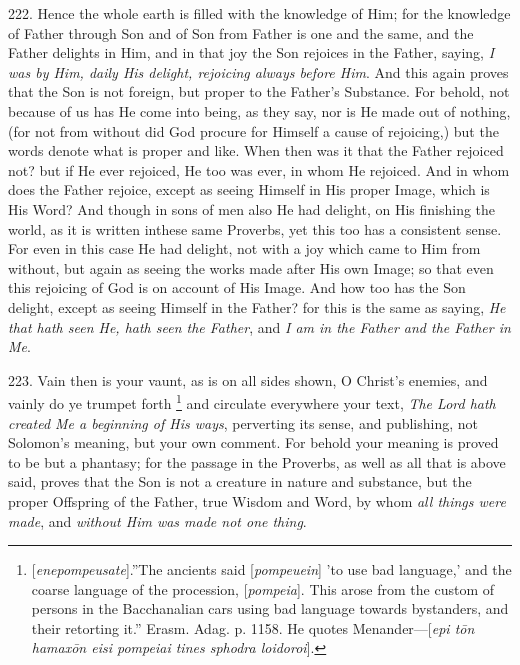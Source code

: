222. Hence the whole earth is
filled with the knowledge of Him; for the knowledge of Father through
Son and of Son from Father is one and the same, and the Father
delights in Him, and in that joy the Son rejoices in the Father,
saying, \emph{I was by Him, daily His delight, rejoicing always before
Him}. And this again proves that the Son is not foreign, but proper
to the Father's Substance. For behold, not because of us has He come
into being, as they say, nor is He made out of nothing, (for not from
without did God procure for Himself a cause of rejoicing,) but the
words denote what is proper and like. When then was it that the Father
rejoiced not? but if He ever rejoiced, He too was ever, in whom He
rejoiced. And in whom does the Father rejoice, except as seeing
Himself in His proper Image, which is His Word? And though in sons of
men also He had delight, on His finishing the world, as it is written
in\emph{}these same Proverbs, yet this too has a consistent sense.
For even in this case He had delight, not with a joy which came to Him
from without, but again as seeing the works made after His own Image;
so that even this rejoicing of God is on account of His Image. And how
too has the Son delight, except as seeing Himself in the Father? for
this is the same as saying, \emph{He that hath seen He, hath seen the
Father}, and \emph{I am in the Father and the Father in Me}.

223. Vain then is your vaunt,
as is on all sides shown, O Christ's enemies, and vainly do ye trumpet
forth \footnote{[\emph{enepompeusate}].\emph{}''The ancients said [\emph{pompeuein}]
'to use bad language,' and the coarse language of the procession, [\emph{pompeia}].
This arose from the custom of persons in the Bacchanalian cars using
bad language towards bystanders, and their retorting it.'' Erasm. Adag.
p. 1158. He quotes Menander—[\emph{epi t\={o}n hamax\={o}n eisi
pompeiai tines sphodra loidoroi}].} and circulate
everywhere your text, \emph{The Lord hath created Me a beginning of His
ways}, perverting its sense, and publishing, not Solomon's meaning,
but your own comment. For behold your meaning is proved to be
but a phantasy; for the passage in the Proverbs, as well as all that
is above said, proves that the Son is not a creature in nature and
substance, but the proper Offspring of the Father, true Wisdom and
Word, by whom \emph{all things were made}, and \emph{without Him was made
not one thing}.



